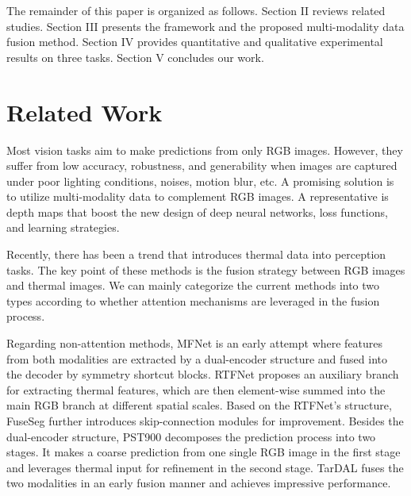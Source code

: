 \documentclass[letterpaper, 10 pt, journal, twoside]{IEEEtran}
\begin{document}
The remainder of this paper is organized as follows. Section II reviews related studies. Section III presents the framework and the proposed multi-modality data fusion method. Section IV provides quantitative and qualitative experimental results on three tasks. Section V concludes our work. 
















\section{Related Work}
\label{sec_related_work}





Most vision tasks aim to make predictions from only RGB images. However, they suffer from low accuracy, robustness, and generability when images are captured under poor lighting conditions, noises, motion blur, etc. A promising solution is to utilize multi-modality data to complement RGB images. A representative is depth maps \cite{Fusenet,he2017std2p,seichter2021efficient,Hu2022DeepDC} that boost the new design of deep neural networks, loss functions, and learning strategies.


Recently, there has been a trend that introduces thermal data into perception tasks. The key point of these methods is the fusion strategy between RGB images and thermal images.
We can mainly categorize the current methods into two types according to whether attention mechanisms are leveraged in the fusion process.

Regarding non-attention methods, MFNet \cite{MFNet} is an early attempt where features from both modalities are extracted by a dual-encoder structure and fused into the decoder by symmetry shortcut blocks. RTFNet \cite{RTFNet} proposes an auxiliary branch for extracting thermal features, which are then element-wise summed into the main RGB branch at different spatial scales. Based on the RTFNet's structure, FuseSeg \cite{FuseSeg} further introduces skip-connection modules for improvement. Besides the dual-encoder structure, PST900 \cite{pst900} decomposes the prediction process into two stages. It makes a coarse prediction from one single RGB image in the first stage and leverages thermal input for refinement in the second stage. TarDAL \cite{m3fd} fuses the two modalities in an early fusion manner and achieves impressive performance.
\end{document}
